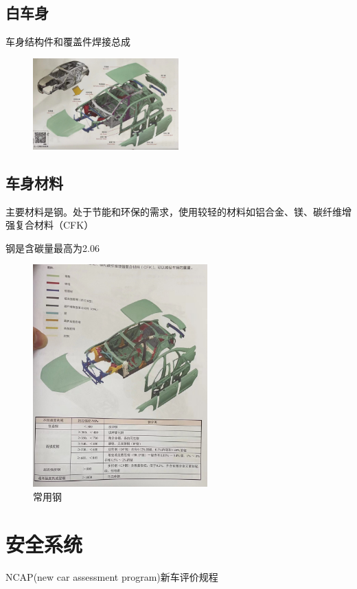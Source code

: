 \subsection{白车身}
车身结构件和覆盖件焊接总成

\begin{figure}[htbp]
	\centering
	\includegraphics[width=0.5\textwidth]{4-3}
\end{figure}

\subsection{车身材料}
主要材料是钢。处于节能和环保的需求，使用较轻的材料如铝合金、镁、碳纤维增强复合材料（CFK）

钢是含碳量最高为2.06%

\begin{figure}[htbp]
	\centering
	\caption{常用钢}
	\includegraphics[width=0.6\textwidth]{4-4}
\end{figure}

\section{安全系统}
NCAP(new car assessment program)新车评价规程

